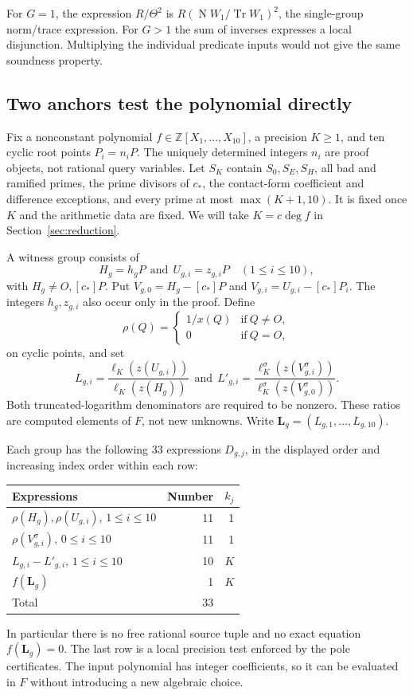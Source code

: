 \documentclass[11pt,reqno]{amsart}
\theoremstyle{definition}
\numberwithin{equation}{section}
\newcommand{\Z}{\mathbb Z}
\newcommand{\Nm}{\operatorname{N}}
\newcommand{\Tr}{\operatorname{Tr}}
\def\t{\text}
\begin{document}
For $G=1$, the expression $R/\Theta^2$ is $R(\Nm W_1/\Tr W_1)^2$, the single-group norm/trace expression. For $G>1$ the sum of inverses expresses a local disjunction. Multiplying the individual predicate inputs would not give the same soundness property.

\subsection{Two anchors test the polynomial directly}
Fix a nonconstant polynomial $f\in\Z[X_1,\ldots,X_{10}]$, a precision $K\ge1$, and ten cyclic root points $P_i=n_iP$. The uniquely determined integers $n_i$ are proof objects, not rational query variables. Let $S_K$ contain $S_0,S_E,S_H$, all bad and ramified primes, the prime divisors of $c_\ast$, the contact-form coefficient and difference exceptions, and every prime at most $\max(K+1,10)$. It is fixed once $K$ and the arithmetic data are fixed. We will take $K=c\deg f$ in Section~\ref{sec:reduction}.

A witness group consists of
\[
 H_g=h_gP\ \ \t{and}\ \ U_{g,i}=z_{g,i}P\quad(1\le i\le10),
\]
with $H_g\ne O,[c_\ast]P$. Put $V_{g,0}=H_g-[c_\ast]P$ and $V_{g,i}=U_{g,i}-[c_\ast]P_i$. The integers $h_g,z_{g,i}$ also occur only in the proof. Define
\[
 \rho(Q)=\begin{cases}1/x(Q)&\t{if}\ Q\ne O,\\0&\t{if}\ Q=O,\end{cases}
\]
on cyclic points, and set
\begin{equation}\label{eq:directratios}
 L_{g,i}=\frac{\ell_K(z(U_{g,i}))}{\ell_K(z(H_g))}\ \ \t{and}\ \ 
 L'_{g,i}=\frac{\ell_K^\sigma(z(V_{g,i}^\sigma))}
 {\ell_K^\sigma(z(V_{g,0}^\sigma))}.
\end{equation}
Both truncated-logarithm denominators are required to be nonzero. These ratios are computed elements of $F$, not new unknowns. Write $\mathbf L_g=(L_{g,1},\ldots,L_{g,10})$.

Each group has the following 33 expressions $D_{g,j}$, in the displayed order and increasing index order within each row:
\begin{center}\small
\begin{tabular}{@{}p{8.8cm}rr@{}}
\toprule
Expressions & Number & $k_j$\\\midrule
$\rho(H_g),\rho(U_{g,i})$, $1\le i\le10$ &11&1\\
$\rho(V_{g,i}^\sigma)$, $0\le i\le10$ &11&1\\
$L_{g,i}-L'_{g,i}$, $1\le i\le10$ &10&$K$\\
$f(\mathbf L_g)$ &1&$K$\\\midrule
Total &33&\\\bottomrule
\end{tabular}
\end{center}
In particular there is no free rational source tuple and no exact equation $f(\mathbf L_g)=0$. The last row is a local precision test enforced by the pole certificates. The input polynomial has integer coefficients, so it can be evaluated in $F$ without introducing a new algebraic choice.
\end{document}
